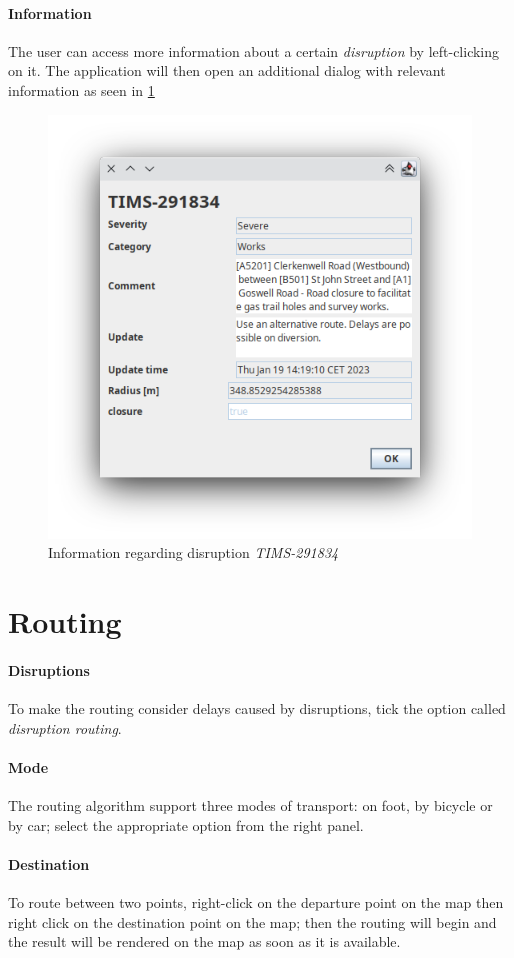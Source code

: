\paragraph{Information}
The user can access more information about a certain \textit{disruption} 
by left-clicking on it. The application will then open an additional dialog 
with relevant information as seen in \ref{fig:mainappdialog2}

\begin{figure}[H]
	\centering
	\includegraphics[width=0.5\linewidth]{assets/mainapp_dialog2.png}
	\caption[]{
		Information regarding disruption \textit{TIMS-291834}
	}
	\label{fig:mainappdialog2}
\end{figure}

\section{Routing}

\paragraph{Disruptions}
To make the routing consider delays caused by disruptions, tick the option 
called \textit{disruption routing}.

\paragraph{Mode}
The routing algorithm support three modes of transport: on foot, by bicycle or 
by car; select the appropriate option from the right panel.

\paragraph{Destination}
To route between two points, right-click on the departure point on the map then 
right click on the destination point on the map; then the routing will begin 
and the result will be rendered on the map as soon as it is available.

